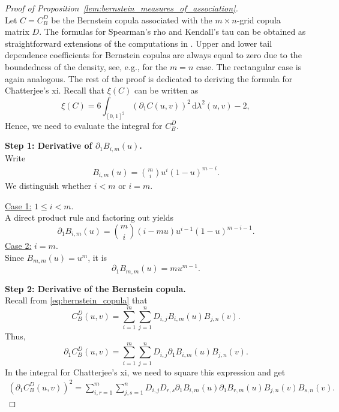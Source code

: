 \documentclass{article}
\theoremstyle{definition}
\newcommand{\de}{\mathrm{\,d}}
\begin{document}
\begin{proof}[Proof of Proposition~\ref{lem:bernstein_measures_of_association}]
  \label{proof:bernstein_measures_of_association}~\\
  Let $C = C_B^D$ be the Bernstein copula associated with the $m\times n$-grid copula matrix $D$.
  The formulas for Spearman's rho and Kendall's tau can be obtained as straightforward extensions of the computations in \cite[Theorems~9 and~10]{durrleman2000copulas}.
  Upper and lower tail dependence coefficients for Bernstein copulas are always equal to zero due to the boundedness of the density, see, e.g., \cite[Example 1]{pfeifer2016new} for the $m=n$ case.
  The rectangular case is again analogous.
  The rest of the proof is dedicated to deriving the formula for Chatterjee's xi. Recall that \(\xi(C)\) can be written as
  \[
    \xi(C) = 6 \int_{[0,1]^2}\left(\partial_1 C(u,v)\right)^2 \de \lambda^2(u,v)-2
  ,\]
  Hence, we need to evaluate the integral for $C_B^D$.

\medskip\noindent
\textbf{Step 1: Derivative of \(\partial_1 B_{i,m}(u)\).}\\
Write
\begin{align}\label{eq:bernstein_copula_binom}
B_{i,m}(u)=\binom{m}{i}u^i(1-u)^{m-i}.
\end{align}
We distinguish whether $i < m$ or $i=m$.

\smallskip
\noindent
\underline{Case 1:} $1 \le i < m$.\\
A direct product rule and factoring out yields
\[
    \partial_1 B_{i,m}(u)=\binom{m}{i}\left(i - mu\right)u^{i-1}(1-u)^{m-i-1}.
\]
\noindent
\underline{Case 2:} $i = m$.\\
Since $B_{m,m}(u) = u^m$, it is
\[
    \partial_1 B_{m,m}(u)=mu^{m-1}.
\]

\medskip
\noindent
\textbf{Step 2: Derivative of the Bernstein copula.}\\
Recall from \eqref{eq:bernstein_copula} that
\[
    C_B^D(u,v)=\sum_{i=1}^m\sum_{j=1}^n D_{i,j}B_{i,m}(u)B_{j,n}(v).
\]
Thus,
\[
    \partial_1 C_B^D(u,v)=\sum_{i=1}^m\sum_{j=1}^n  D_{i,j}  \partial_1 B_{i,m}(u) B_{j,n}(v).
\]
In the integral for Chatterjee's xi, we need to square this expression and get
\begin{align}\label{eq:partial1_C_B_D}
\left(\partial_1 C_B^D(u,v)\right)^2
= \sum_{i,r=1}^m\sum_{j,s=1}^n  D_{i,j}D_{r,s}  \partial_1 B_{i,m}(u)\partial_1 B_{r,m}(u)  B_{j,n}(v)B_{s,n}(v).
\end{align}


\end{proof}
\end{document}
